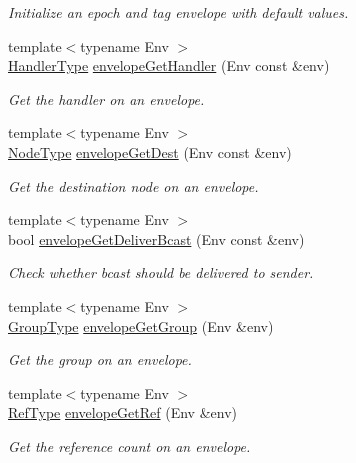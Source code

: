 \begin{DoxyCompactItemize}
\begin{DoxyCompactList}\small\item\em Initialize an epoch and tag envelope with default values. \end{DoxyCompactList}\item 
{\footnotesize template$<$typename Env $>$ }\\\hyperlink{namespacevt_af64846b57dfcaf104da3ef6967917573}{Handler\+Type} \hyperlink{namespacevt_ad3c1fff07670b717ba492d97e9eecc48}{envelope\+Get\+Handler} (Env const \&env)
\begin{DoxyCompactList}\small\item\em Get the handler on an envelope. \end{DoxyCompactList}\item 
{\footnotesize template$<$typename Env $>$ }\\\hyperlink{namespacevt_a866da9d0efc19c0a1ce79e9e492f47e2}{Node\+Type} \hyperlink{namespacevt_a99cdbbb47f13203e14b01fa43bca99e9}{envelope\+Get\+Dest} (Env const \&env)
\begin{DoxyCompactList}\small\item\em Get the destination node on an envelope. \end{DoxyCompactList}\item 
{\footnotesize template$<$typename Env $>$ }\\bool \hyperlink{namespacevt_a3f298caa64a97f60a0772b74cad8b620}{envelope\+Get\+Deliver\+Bcast} (Env const \&env)
\begin{DoxyCompactList}\small\item\em Check whether bcast should be delivered to sender. \end{DoxyCompactList}\item 
{\footnotesize template$<$typename Env $>$ }\\\hyperlink{namespacevt_a27b5e4411c9b6140c49100e050e2f743}{Group\+Type} \hyperlink{namespacevt_a76b9bdf05b27d6470bac66186c32d9eb}{envelope\+Get\+Group} (Env \&env)
\begin{DoxyCompactList}\small\item\em Get the group on an envelope. \end{DoxyCompactList}\item 
{\footnotesize template$<$typename Env $>$ }\\\hyperlink{namespacevt_a9b39ce9494bb04674d0d5b895a5aa50f}{Ref\+Type} \hyperlink{namespacevt_ad664e6e94c1ea309344adad1c3fb291c}{envelope\+Get\+Ref} (Env \&env)
\begin{DoxyCompactList}\small\item\em Get the reference count on an envelope. \end{DoxyCompactList}\item 

\end{DoxyCompactItemize}
